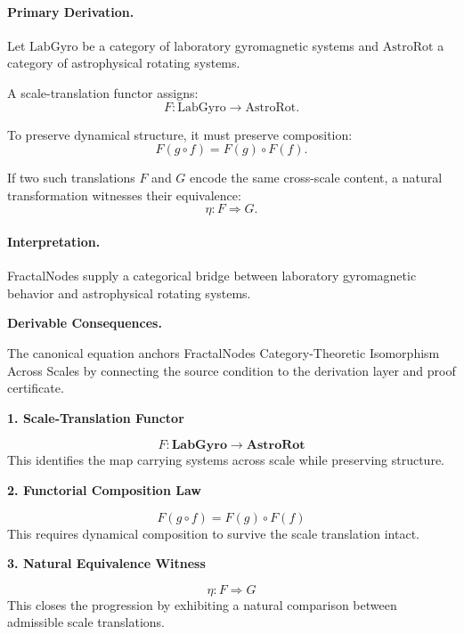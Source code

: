 \paragraph{Primary Derivation.}
Let $\mathrm{LabGyro}$ be a category of laboratory gyromagnetic systems and $\mathrm{AstroRot}$ a category of astrophysical rotating systems.

A scale-translation functor assigns:
\begin{equation}
F:\mathrm{LabGyro}\to\mathrm{AstroRot}.
\end{equation}

To preserve dynamical structure, it must preserve composition:
\begin{equation}
F(g\circ f)=F(g)\circ F(f).
\end{equation}

If two such translations $F$ and $G$ encode the same cross-scale content, a natural transformation witnesses their equivalence:
\begin{equation}
\boxed{
\eta:F\Rightarrow G .
}
\end{equation}

\paragraph{Interpretation.}
FractalNodes supply a categorical bridge between laboratory gyromagnetic behavior and astrophysical rotating systems.

\par\vspace{0.35em}
\noindent\textbf{Derivable Consequences.}\quad
\begingroup
\footnotesize
\raggedright
The canonical equation anchors FractalNodes Category-Theoretic Isomorphism Across Scales by connecting the source condition to the derivation layer and proof certificate.
\par\endgroup

\noindent\textbf{1. Scale-Translation Functor}\par
\[
F: \mathbf{LabGyro} \longrightarrow \mathbf{AstroRot}
\]
\noindent This identifies the map carrying systems across scale while preserving structure.\par
\noindent\textbf{2. Functorial Composition Law}\par
\[
F(g\circ f)=F(g)\circ F(f)
\]
\noindent This requires dynamical composition to survive the scale translation intact.\par
\noindent\textbf{3. Natural Equivalence Witness}\par
\[
\eta: F \Rightarrow G
\]
\noindent This closes the progression by exhibiting a natural comparison between admissible scale translations.\par

